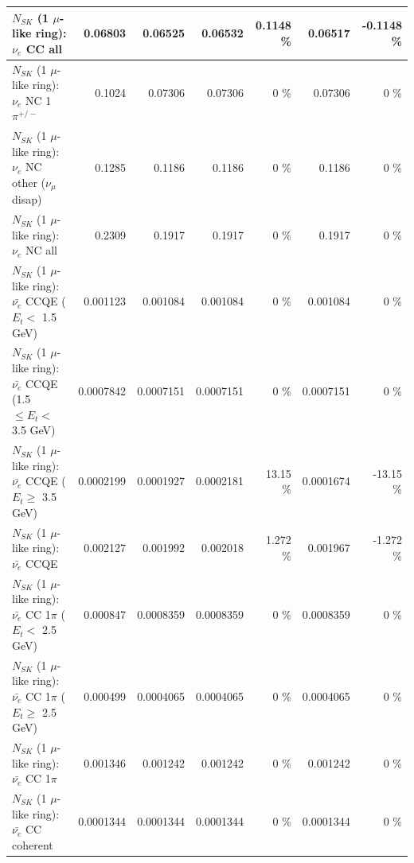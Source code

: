 \begin{table}
\begin{tabular}{| l | r | r | r  r | r  r |}
                                  $N_{SK}$ (1 $\mu$-like ring): $\nu_{e}$ CC all &         0.06803 &         0.06525 &         0.06532 &   0.1148 \%  &         0.06517 &  -0.1148 \%  \\ 
\hline
                           $N_{SK}$ (1 $\mu$-like ring): $\nu_e$ NC 1$\pi^{+/-}$ &          0.1024 &         0.07306 &         0.07306 &        0 \%  &         0.07306 &        0 \%  \\ 
                $N_{SK}$ (1 $\mu$-like ring): $\nu_e$ NC other ($\nu_\mu$ disap) &          0.1285 &          0.1186 &          0.1186 &        0 \%  &          0.1186 &        0 \%  \\ 
                                  $N_{SK}$ (1 $\mu$-like ring): $\nu_{e}$ NC all &          0.2309 &          0.1917 &          0.1917 &        0 \%  &          0.1917 &        0 \%  \\ 
\hline
\hline
\hline
            $N_{SK}$ (1 $\mu$-like ring): $\bar{\nu_e}$ CCQE ($E_{t} <$ 1.5 GeV) &        0.001123 &        0.001084 &        0.001084 &        0 \%  &        0.001084 &        0 \%  \\ 
   $N_{SK}$ (1 $\mu$-like ring): $\bar{\nu_e}$ CCQE (1.5 $\leq E_{t} <$ 3.5 GeV) &       0.0007842 &       0.0007151 &       0.0007151 &        0 \%  &       0.0007151 &        0 \%  \\ 
         $N_{SK}$ (1 $\mu$-like ring): $\bar{\nu_e}$ CCQE ($E_{t} \geq$ 3.5 GeV) &       0.0002199 &       0.0001927 &       0.0002181 &    13.15 \%  &       0.0001674 &   -13.15 \%  \\ 
\hline
                                $N_{SK}$ (1 $\mu$-like ring): $\bar{\nu_e}$ CCQE &        0.002127 &        0.001992 &        0.002018 &    1.272 \%  &        0.001967 &   -1.272 \%  \\ 
\hline
       $N_{SK}$ (1 $\mu$-like ring): $\bar{\nu_e}$ CC 1$\pi$ ($E_{t} <$ 2.5 GeV) &        0.000847 &       0.0008359 &       0.0008359 &        0 \%  &       0.0008359 &        0 \%  \\ 
    $N_{SK}$ (1 $\mu$-like ring): $\bar{\nu_e}$ CC 1$\pi$ ($E_{t} \geq$ 2.5 GeV) &        0.000499 &       0.0004065 &       0.0004065 &        0 \%  &       0.0004065 &        0 \%  \\ 
\hline
                           $N_{SK}$ (1 $\mu$-like ring): $\bar{\nu_e}$ CC 1$\pi$ &        0.001346 &        0.001242 &        0.001242 &        0 \%  &        0.001242 &        0 \%  \\ 
                         $N_{SK}$ (1 $\mu$-like ring): $\bar{\nu_e}$ CC coherent &       0.0001344 &       0.0001344 &       0.0001344 &        0 \%  &       0.0001344 &        0 \%  \\ 

\end{tabular}
\end{table}
